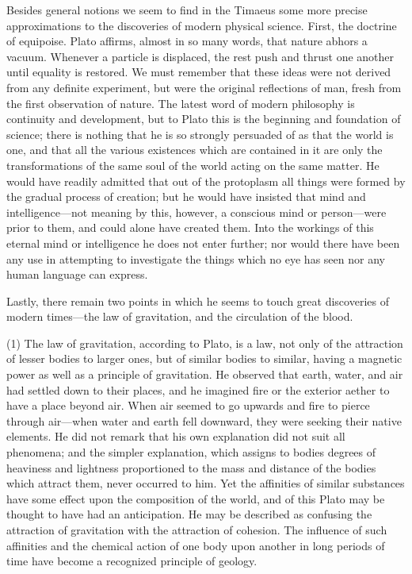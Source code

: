 \documentclass[11pt,letter]{article}
\begin{document}
\par  Besides general notions we seem to find in the Timaeus some more precise approximations to the discoveries of modern physical science. First, the doctrine of equipoise. Plato affirms, almost in so many words, that nature abhors a vacuum. Whenever a particle is displaced, the rest push and thrust one another until equality is restored. We must remember that these ideas were not derived from any definite experiment, but were the original reflections of man, fresh from the first observation of nature. The latest word of modern philosophy is continuity and development, but to Plato this is the beginning and foundation of science; there is nothing that he is so strongly persuaded of as that the world is one, and that all the various existences which are contained in it are only the transformations of the same soul of the world acting on the same matter. He would have readily admitted that out of the protoplasm all things were formed by the gradual process of creation; but he would have insisted that mind and intelligence—not meaning by this, however, a conscious mind or person—were prior to them, and could alone have created them. Into the workings of this eternal mind or intelligence he does not enter further; nor would there have been any use in attempting to investigate the things which no eye has seen nor any human language can express.

\par  Lastly, there remain two points in which he seems to touch great discoveries of modern times—the law of gravitation, and the circulation of the blood.

\par  (1) The law of gravitation, according to Plato, is a law, not only of the attraction of lesser bodies to larger ones, but of similar bodies to similar, having a magnetic power as well as a principle of gravitation. He observed that earth, water, and air had settled down to their places, and he imagined fire or the exterior aether to have a place beyond air. When air seemed to go upwards and fire to pierce through air—when water and earth fell downward, they were seeking their native elements. He did not remark that his own explanation did not suit all phenomena; and the simpler explanation, which assigns to bodies degrees of heaviness and lightness proportioned to the mass and distance of the bodies which attract them, never occurred to him. Yet the affinities of similar substances have some effect upon the composition of the world, and of this Plato may be thought to have had an anticipation. He may be described as confusing the attraction of gravitation with the attraction of cohesion. The influence of such affinities and the chemical action of one body upon another in long periods of time have become a recognized principle of geology.
\end{document}
